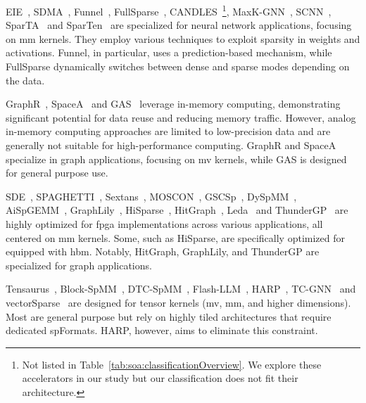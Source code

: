 EIE~\cite{Han2016_EIE}, SDMA~\cite{Gao2023_SDMA}, Funnel~\cite{Ma2024_Funnel}, FullSparse~\cite{Yu2024_FullSparse}, CANDLES~\cite{Gudaparthi2022_CANDLES}\footnote{\label{fn:additional_acc}Not listed in Table~\ref{tab:soa:classificationOverview}. We explore these accelerators in our study but our classification does not fit their architecture.}, MaxK-GNN~\cite{Peng2024_MaxK-GNN}, SCNN~\cite{Angshuman2017_SCNN}, SparTA~\cite{Ningxin2022_SparTA} and SparTen~\cite{Gondimalla2019_SparTen} are specialized for neural network applications, focusing on \acrshort{mm} kernels.
They employ various techniques to exploit sparsity in weights and activations.
Funnel, in particular, uses a prediction-based mechanism, while FullSparse dynamically switches between dense and sparse modes depending on the data.

GraphR~\cite{Song2018_GraphR}, SpaceA~\cite{Xie2021_SpaceA} and GAS~\cite{Zhang2024_GAS} leverage in-memory computing, demonstrating significant potential for data reuse and reducing memory traffic.
However, analog in-memory computing approaches are limited to low-precision data and are generally not suitable for high-performance computing.
GraphR and SpaceA specialize in graph applications, focusing on \acrshort{mv} kernels, while GAS is designed for general purpose use.

SDE~\cite{Hosseinabady2019_SDE}, SPAGHETTI~\cite{Hojabr2021_SPAGHETTI}, Sextans~\cite{Song2022_Sextans}, MOSCON~\cite{Noble2023_MOSCON}, GSCSp~\cite{Li2023_GSCSp}, DySpMM~\cite{Wang2024_DySpMM}, AiSpGEMM~\cite{Tang2025_AiSpGEMM}, GraphLily~\cite{Hu2021_GraphLily}, HiSparse~\cite{Du2022_HiSparse}, HitGraph~\cite{Zhou2019_HitGraph}, Leda~\cite{Yi2025_Leda} and ThunderGP~\cite{Chen2022_ThunderGP} are highly optimized for \acrshort{fpga} implementations across various applications, all centered on \acrshort{mm} kernels.
Some, such as HiSparse, are specifically optimized for  equipped with \acrfull{hbm}.
Notably, HitGraph, GraphLily, and ThunderGP are specialized for graph applications.

Tensaurus~\cite{Srivastava2020_Tensaurus}, Block-SpMM~\cite{NVIDIA2014_cuSPARSE}, DTC-SpMM~\cite{Fan2024_DTC-SpMM}, Flash-LLM~\cite{Xia2023_Flash-LLM}, HARP~\cite{Kim2023_HARP}, TC-GNN~\cite{Yuke2023_TC-GNN} and vectorSparse~\cite{Gale2020_vectorSparse} are designed for tensor kernels (\acrshort{mv}, \acrshort{mm}, and higher dimensions).
Most are general purpose but rely on highly tiled architectures that require dedicated \glspl{spFormat}.
HARP, however, aims to eliminate this constraint.

